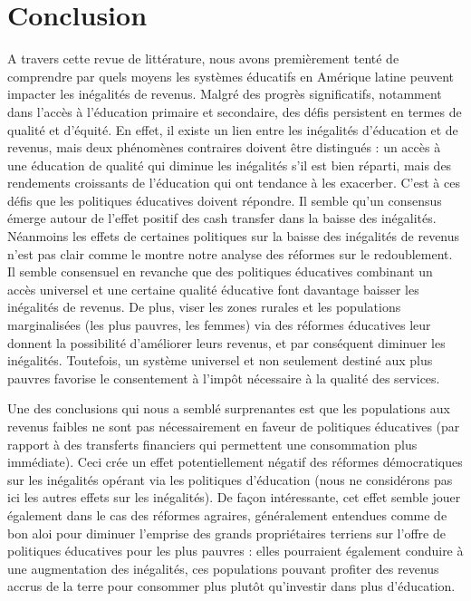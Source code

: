 \documentclass[pagesize, twoside=off, bibliography=totoc, DIV=calc, fontsize=12pt, a4paper, french]{scrartcl}
\begin{document}
\section{Conclusion}

\label{sec_conc}

A travers cette revue de littérature, nous avons premièrement tenté de comprendre par quels moyens les systèmes éducatifs en Amérique latine peuvent impacter les inégalités de revenus. Malgré des progrès significatifs, notamment dans l'accès à l'éducation primaire et secondaire, des défis persistent en termes de qualité et d'équité.  En effet, il existe un lien entre les inégalités d’éducation et de revenus, mais deux phénomènes contraires doivent être distingués : un accès à une éducation de qualité qui diminue les inégalités s’il est bien réparti, mais des rendements croissants de l’éducation qui ont tendance à les exacerber. C’est à ces défis que les politiques éducatives doivent répondre. Il semble qu’un consensus émerge autour de l’effet positif des cash transfer dans la baisse des inégalités. Néanmoins les effets de certaines politiques sur la baisse des inégalités de revenus n’est pas clair comme le montre notre analyse des réformes sur le redoublement. Il semble consensuel en revanche que des politiques éducatives combinant un accès universel et une certaine qualité éducative font davantage baisser les inégalités de revenus. De plus, viser les zones rurales et les populations marginalisées (les plus pauvres, les femmes) via des réformes éducatives leur donnent la possibilité d’améliorer leurs revenus, et par conséquent diminuer les inégalités. Toutefois, un système universel et non seulement destiné aux plus pauvres favorise le consentement à l’impôt nécessaire à la qualité des services. 

Une des conclusions qui nous a semblé surprenantes est que les populations aux revenus faibles ne sont pas nécessairement en faveur de politiques éducatives (par rapport à des transferts financiers qui permettent une consommation plus immédiate). Ceci crée un effet potentiellement négatif des réformes démocratiques sur les inégalités opérant via les politiques d’éducation (nous ne considérons pas ici les autres effets sur les inégalités). De façon intéressante, cet effet semble jouer également dans le cas des réformes agraires, généralement entendues comme de bon aloi pour diminuer l’emprise des grands propriétaires terriens sur l’offre de politiques éducatives pour les plus pauvres : elles pourraient également conduire à une augmentation des inégalités, ces populations pouvant profiter des revenus accrus de la terre pour consommer plus plutôt qu’investir dans plus d’éducation.
\end{document}
